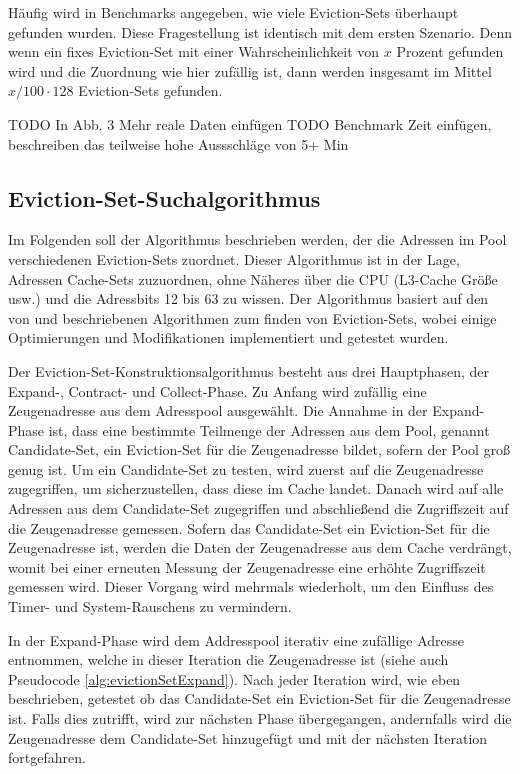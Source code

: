 Häufig wird in Benchmarks angegeben, wie viele Eviction-Sets überhaupt gefunden wurden.
Diese Fragestellung ist identisch mit dem ersten Szenario.
Denn wenn ein fixes Eviction-Set mit einer Wahrscheinlichkeit von $x$ Prozent gefunden wird und die Zuordnung wie hier zufällig ist, dann werden insgesamt im Mittel $x/100 \cdot 128$ Eviction-Sets gefunden.

TODO In Abb. 3 Mehr reale Daten einfügen
TODO Benchmark Zeit einfügen, beschreiben das teilweise hohe Aussschläge von 5+ Min


\subsection{Eviction-Set-Suchalgorithmus}
\label{evictionSetSearchAlgo}

Im Folgenden soll der Algorithmus beschrieben werden, der die Adressen im Pool verschiedenen Eviction-Sets zuordnet.
Dieser Algorithmus ist in der Lage, Adressen Cache-Sets zuzuordnen, ohne Näheres über die CPU (L3-Cache Größe usw.) und die Adressbits 12 bis 63 zu wissen.
Der Algorithmus basiert auf den von \cite{DriveByPaper} und \cite{PrimeAndAbort} beschriebenen Algorithmen zum finden von Eviction-Sets, wobei einige Optimierungen und Modifikationen implementiert und getestet wurden.

Der Eviction-Set-Konstruktionsalgorithmus besteht aus drei Hauptphasen, der Expand-, Contract- und Collect-Phase. 
Zu Anfang wird zufällig eine Zeugenadresse aus dem Adresspool ausgewählt.
Die Annahme in der Expand-Phase ist, dass eine bestimmte Teilmenge der Adressen aus dem Pool, genannt Candidate-Set, ein Eviction-Set für die Zeugenadresse bildet, sofern der Pool groß genug ist. 
Um ein Candidate-Set zu testen, wird zuerst auf die Zeugenadresse zugegriffen, um sicherzustellen, dass diese im Cache landet.
Danach wird auf alle Adressen aus dem Candidate-Set zugegriffen und abschließend die Zugriffszeit auf die Zeugenadresse gemessen. 
Sofern das Candidate-Set ein Eviction-Set für die Zeugenadresse ist, werden die Daten der Zeugenadresse aus dem Cache verdrängt, womit bei einer erneuten Messung der Zeugenadresse eine erhöhte Zugriffszeit gemessen wird.
Dieser Vorgang wird mehrmals wiederholt, um den Einfluss des Timer- und System-Rauschens zu vermindern.

In der Expand-Phase wird dem Addresspool iterativ eine zufällige Adresse entnommen, welche in dieser Iteration die Zeugenadresse ist (siehe auch Pseudocode \ref{alg:evictionSetExpand}).
Nach jeder Iteration wird, wie eben beschrieben, getestet ob das Candidate-Set ein Eviction-Set für die Zeugenadresse ist.
Falls dies zutrifft, wird zur nächsten Phase übergegangen, andernfalls wird die Zeugenadresse dem Candidate-Set hinzugefügt und mit der nächsten Iteration fortgefahren.

